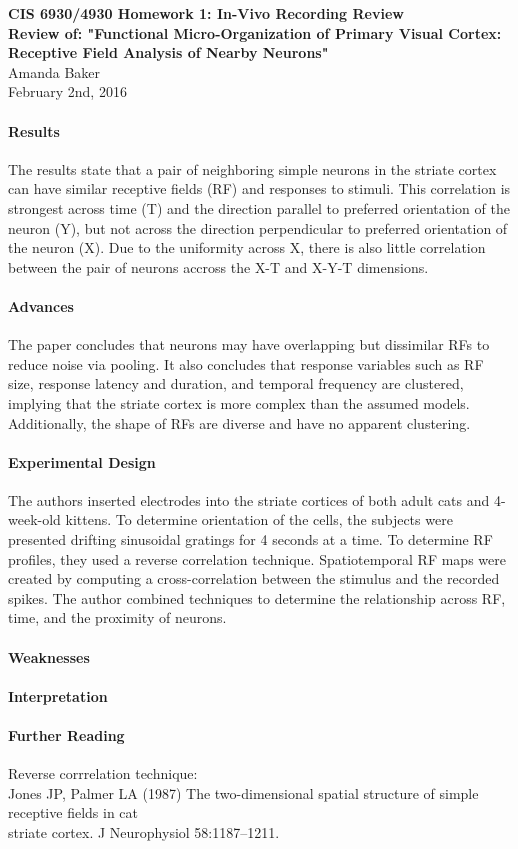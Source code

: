 \documentclass[11pt]{article}
\begin{document}
\begin{center}
{\large {\bf CIS 6930/4930 Homework 1: In-Vivo Recording Review}}\\
{\normalsize {\bf Review of: "Functional Micro-Organization of Primary Visual Cortex: Receptive
Field Analysis of Nearby Neurons"}}\\
Amanda Baker \\
February 2nd, 2016 \\
\end{center}

\paragraph{Results}
The results state that a pair of neighboring simple neurons in the striate cortex
can have similar receptive fields (RF) and responses to stimuli.  This correlation is
strongest across time (T) and the direction parallel to preferred orientation of
the neuron (Y), but not across the direction perpendicular to preferred orientation
of the neuron (X).  Due to the uniformity across X, there is also little correlation
between the pair of neurons accross the X-T and X-Y-T dimensions.

\paragraph{Advances}
The paper concludes that neurons may have overlapping but dissimilar RFs to reduce
noise via pooling. It also concludes that response variables such as RF size, response
latency and duration, and temporal frequency are clustered, implying that the striate
cortex is more complex than the assumed models.  Additionally, the shape of RFs are
diverse and have no apparent clustering.

\paragraph{Experimental Design}
The authors inserted electrodes into the striate cortices of both adult cats and
4-week-old kittens.  To determine orientation of the cells, the subjects were presented
drifting sinusoidal gratings for 4 seconds at a time.  To determine RF profiles,
they used a reverse correlation technique.  Spatiotemporal RF maps were created
by computing a cross-correlation between the stimulus and the recorded spikes.
The author combined techniques to determine the relationship across RF, time, and
the proximity of neurons.

\paragraph{Weaknesses}

\paragraph{Interpretation}

\paragraph{Further Reading}
Reverse corrrelation technique: \\
\hspace*{0.5in} Jones JP, Palmer LA (1987) The two-dimensional spatial structure of simple receptive fields in cat \\
\hspace*{0.5in} striate cortex. J Neurophysiol 58:1187–1211. \\
\end{document}
